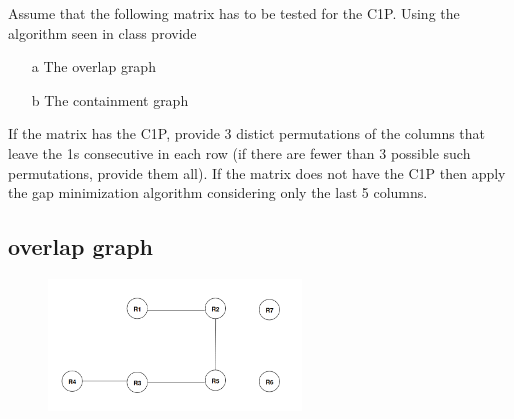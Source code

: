 \documentclass[]{article}
\begin{document}
Assume that the following matrix has to be tested for the C1P. Using the algorithm seen in class provide
\begin{enumerate}

\item[a] The overlap graph
\item[b] The containment graph

\end{enumerate}

If the matrix has the C1P, provide 3 distict permutations of the columns that leave the 1s consecutive
in each row (if there are fewer than 3 possible such permutations, provide them all). If the matrix does not have the C1P then apply the gap minimization algorithm considering only the last 5 columns.

%
%
%
%
%
%

%
%

\subsection{overlap graph}

\begin{figure}[H]
	\begin{center}
		\includegraphics[width=0.6\textwidth]{overlap_graph.png}
	\end{center}
\end{figure}
\end{document}
